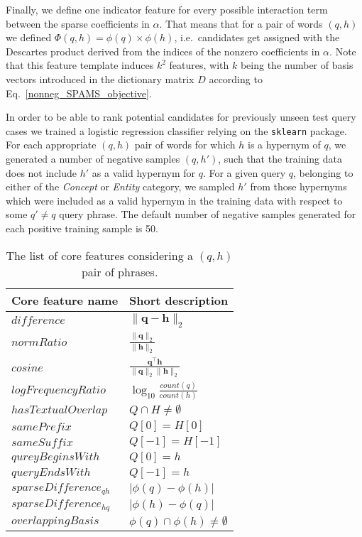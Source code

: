 \documentclass[11pt,a4paper]{article}
\begin{document}
Finally, we define one indicator feature for every possible interaction term
between the sparse coefficients in $\alpha$. That means that for a pair of
words $(q, h)$ we defined $\Phi(q,h)=\phi(q) \times \phi(h)$, i.e.~candidates
get assigned with the Descartes product derived from the indices of the nonzero
coefficients in $\alpha$. Note that this feature template induces $k^2$
features, with $k$ being the number of basis vectors introduced in the dictionary matrix $D$ according to Eq.~\ref{nonneg_SPAMS_objective}.

In order to be able to rank potential candidates for previously unseen test
query cases we trained a logistic regression classifier relying on the
\texttt{sklearn} package. For each appropriate $(q,h)$ pair of words for which
$h$ is a hypernym of $q$, we generated a number of negative samples $(q, h')$,
such that the training data does not include $h'$ as a valid hypernym for $q$.
For a given query $q$, belonging to either of the \textit{Concept} or
\textit{Entity} category, we sampled $h'$ from those hypernyms which were
included as a valid hypernym in the training data with respect to some $q' \neq
q$ query phrase. The default number of negative samples generated for each
positive training sample is 50.

\begin{table}
	\begin{tabular}{ll}
		Core feature name   & Short description \\  \hline
		$difference$        & $\lVert \mathbf{q} - \mathbf{h} \rVert_2$ \\
		$normRatio$         & $\frac{\lVert \mathbf{q}\rVert_2}{\lVert \mathbf{h} \rVert_2}$ \\
		$cosine$            & $\frac{\mathbf{q}^\intercal \mathbf{h}}{\lVert \mathbf{q} \rVert_2\lVert \mathbf{h} \rVert_2}$ \\
		$logFrequencyRatio$ & $\log_{10}\frac{count(q)}{count(h)}$ \\
		$hasTextualOverlap$ & $Q \cap H \neq \emptyset$ \\
		$samePrefix$        & $Q[0] = H[0]$ \\
		$sameSuffix$        & $Q[-1] = H[-1]$ \\
		$qureyBeginsWith$   & $Q[0] = h$ \\
		$queryEndsWith$     & $Q[-1] = h$ \\
		$sparseDifference_{qh}$ & $\lvert \phi(q) - \phi(h) \rvert$ \\
		$sparseDifference_{hq}$ & $\lvert \phi(h) - \phi(q) \rvert$ \\
		$overlappingBasis$  & $\phi(q) \cap \phi(h) \neq \emptyset$ \\
	\end{tabular}
	\caption{The list of core features considering a $(q,h)$ pair of phrases.}
	\label{table:core_features}
\end{table}
\end{document}
